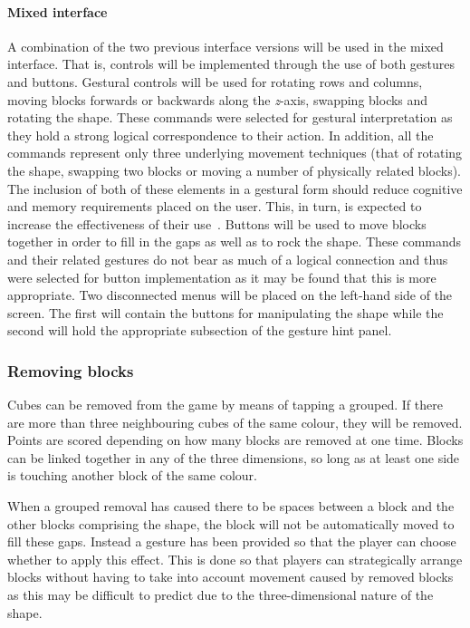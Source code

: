 \paragraph{Mixed interface}
A combination of the two previous interface versions will be used in the mixed interface. That is, controls will be implemented through the use of both gestures and buttons. Gestural controls will be used for rotating rows and columns, moving blocks forwards or backwards along the \emph{z}-axis, swapping blocks and rotating the \gls{shape}. These commands were selected for gestural interpretation as they hold a strong logical correspondence to their action. In addition, all the commands represent only three underlying movement techniques (that of rotating the shape, swapping two blocks or moving a number of physically related blocks). The inclusion of both of these elements in a gestural form should reduce cognitive and memory requirements placed on the user. This, in turn, is expected to increase the effectiveness of their use~\citep{Niel04}. Buttons will be used to move blocks together in order to fill in the gaps as well as to rock the shape. These commands and their related gestures do not bear as much of a logical connection and thus were selected for button implementation as it may be found that this is more appropriate. Two disconnected menus will be placed on the left-hand side of the screen. The first will contain the buttons for manipulating the shape while the second will hold the appropriate subsection of the gesture hint panel.

\subsubsection{Removing blocks}
Cubes can be removed from the game by means of tapping a \gls{grouped}. If there are more than three neighbouring cubes of the same colour, they will be removed. Points are scored depending on how many blocks are removed at one time. Blocks can be linked together in any of the three dimensions, so long as at least one side is touching another block of the same colour.

When a \gls{grouped} removal has caused there to be spaces between a block and the other blocks comprising the \gls{shape}, the block will not be automatically moved to fill these gaps. Instead a gesture has been provided so that the player can choose whether to apply this effect. This is done so that players can strategically arrange blocks without having to take into account movement caused by removed blocks as this may be difficult to predict due to the three-dimensional nature of the shape.

